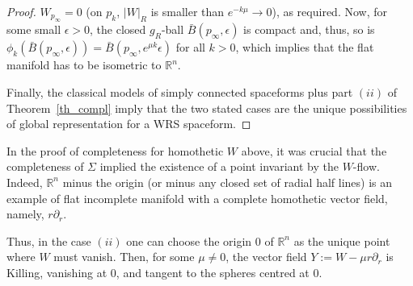\documentclass[reqno,10pt]{amsart}
\newcommand{\R}{\mathds R}
\begin{document}
\begin{proof}
$W_{p_\infty}=0$ (on $p_k$, $|W|_R$ is smaller than $e^{-k\mu}\rightarrow 0$), as required. 
Now, for some small $\epsilon>0$, the closed $g_R$-ball $\bar B(p_\infty,\epsilon)$ 
is compact and, thus, so is $\phi_k(\bar B(p_\infty,\epsilon))=\bar B(p_\infty,e^{\mu k}\epsilon)$ for all $k>0$, which implies  that the flat manifold has to be isometric to $\R^n$. 


Finally,  the classical models of simply connected spaceforms plus part $(ii)$ of Theorem~\ref{th_compl} imply that the two stated cases are the unique possibilities of global representation for a WRS spaceform.

\end{proof}

\begin{rem} In the proof of completeness  for homothetic $W$ above, it was crucial  that  the completeness of $\Sigma$ implied the existence of a point invariant by  the $W$-flow. Indeed, $\R^n$ minus the origin (or minus any closed set of radial half lines) is an example of flat incomplete manifold with a complete homothetic vector field, namely, $r\partial_r$.

Thus, in the case $(ii)$ one can choose the origin $0$ of $\R^n$ as the unique point where $W$ must vanish. Then, for some  $ \mu  \neq 0$, the vector field
$Y:=W-\mu r \partial_r$ is Killing, vanishing  at 0, and tangent to the spheres centred at 0.  
\end{rem}
\end{document}

